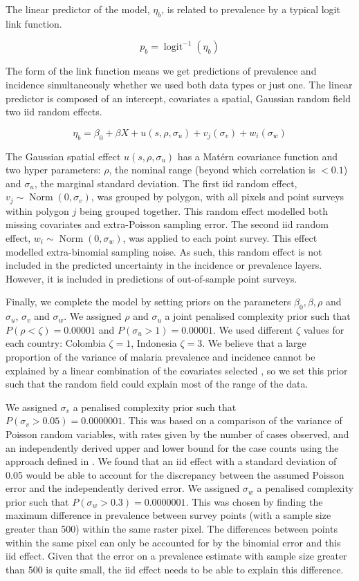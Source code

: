 \documentclass[11pt]{article}
\begin{document}
The linear predictor of the model, $\eta_b$, is related to prevalence by a typical logit link function.

$$p_b = \operatorname{logit}^{-1}(\eta_b)$$


The form of the link function means we get predictions of prevalence and incidence simultaneously whether we used both data types or just one.
The linear predictor is composed of an intercept, covariates a spatial, Gaussian random field two iid random effects.

$$\eta_b = \beta_0 + \beta X  + u(s, \rho, \sigma_u) + v_j(\sigma_v) + w_i(\sigma_w)$$

The Gaussian spatial effect $u(s, \rho, \sigma_u)$ has a Mat\'ern covariance function and two hyper parameters: $\rho$, the nominal range (beyond which correlation is $< 0.1$) and $\sigma_u$, the marginal standard deviation.
The first iid random effect, $v_j \sim \operatorname{Norm}(0, \sigma_v)$,  was grouped by polygon, with all pixels and point surveys within polygon $j$ being grouped together.
This random effect modelled both missing covariates and extra-Poisson sampling error. 
The second iid random effect, $w_i \sim \operatorname{Norm}(0, \sigma_w)$, was applied to each point survey.
This effect modelled extra-binomial sampling noise.
As such, this random effect is not included in the predicted uncertainty in the incidence or prevalence layers.
However, it is included in predictions of out-of-sample point surveys.

Finally, we complete the model by setting priors on the parameters $\beta_0, \beta, \rho$ and $\sigma_u$, $\sigma_v$ and $\sigma_w$. We assigned $\rho$ and $\sigma_u$ a joint penalised complexity prior \cite{fuglstad2018constructing} such that $P(\rho < \zeta) = 0.00001$ and $P(\sigma_u > 1) = 0.00001$. We used different $\zeta$ values for each country: Colombia $\zeta = 1$, Indonesia $\zeta = 3$. We believe that a large proportion of the variance of malaria prevalence and incidence cannot be explained by a linear combination of the covariates selected \cite{bhatt2017improved}, so we set this prior such that the random field could explain most of the range of the data.

We assigned $\sigma_v$ a penalised complexity prior \cite{simpson2017penalising} such that $P(\sigma_v > 0.05) = 0.0000001$. This was based on a comparison of the variance of Poisson random variables, with rates given by the number of cases observed, and an independently derived upper and lower bound for the case counts using the approach defined in \cite{cibulskis2011worldwide}. We found that an iid effect with a standard deviation of 0.05 would be able to account for the discrepancy between the assumed Poisson error and the independently derived error.
We assigned $\sigma_w$ a penalised complexity prior such that $P(\sigma_w > 0.3) = 0.0000001$. 
This was chosen by finding the maximum difference in prevalence between survey points (with a sample size greater than 500) within the same raster pixel.
The differences between points within the same pixel can only be accounted for by the binomial error and this iid effect.
Given that the error on a prevalence estimate with sample size greater than 500 is quite small, the iid effect needs to be able to explain this difference.
\end{document}
